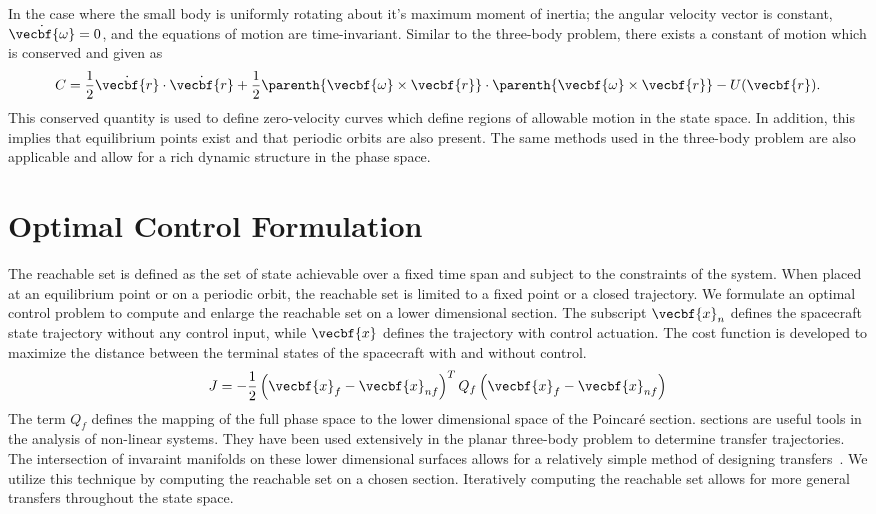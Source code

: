 \documentclass[letterpaper, preprint, paper,11pt]{AAS}	%
\begin{document}
In the case where the small body is uniformly rotating about it's maximum moment of inertia; the angular velocity vector is constant, \( \dot{\vecbf{\omega}} = 0 \), and the equations of motion are time-invariant.
Similar to the three-body problem, there exists a constant of motion which is conserved and given as
\begin{align}
	C = \frac{1}{2} \dot{\vecbf{r}} \cdot \dot{\vecbf{r}} + \frac{1}{2} \parenth{ \vecbf{\omega} \times \vecbf{r}} \cdot \parenth{\vecbf{\omega} \times \vecbf{r}} - U(\vecbf{r}).
\end{align}
This conserved quantity is used to define zero-velocity curves which define regions of allowable motion in the state space.
In addition, this implies that equilibrium points exist and that periodic orbits are also  present.
The same methods used in the three-body problem are also applicable and allow for a rich dynamic structure in the phase space.
\section{Optimal Control Formulation}
The reachable set is defined as the set of state achievable over a fixed time span and subject to the constraints of the system.
When placed at an equilibrium point or on a periodic orbit, the reachable set is limited to a fixed point or a closed trajectory. 
We formulate an optimal control problem to compute and enlarge the reachable set on a lower dimensional \Poincare section. 
The subscript \(\vecbf{x}_n \) defines the spacecraft state trajectory without any control input, while \(\vecbf{x}\) defines the trajectory with control actuation.
The cost function is developed to maximize the distance between the terminal states of the spacecraft with and without control.
\begin{equation}
	J = -\frac{1}{2} \left( \vecbf{x}_f - \vecbf{x}_{nf}\right)^T Q_f \left( \vecbf{x}_f - \vecbf{x}_{nf}\right)
	\label{eq:cost}
\end{equation}
The term \( Q_f \) defines the mapping of the full phase space to the lower dimensional space of the Poincar\'e section.
\Poincare sections are useful tools in the analysis of non-linear systems.
They have been used extensively in the planar three-body problem to determine transfer trajectories.
The intersection of invaraint manifolds on these lower dimensional surfaces allows for a relatively simple method of designing transfers~\cite{koon2011}.
We utilize this technique by computing the reachable set on a chosen \Poincare section.
Iteratively computing the reachable set allows for more general transfers throughout the state space.
\end{document}

